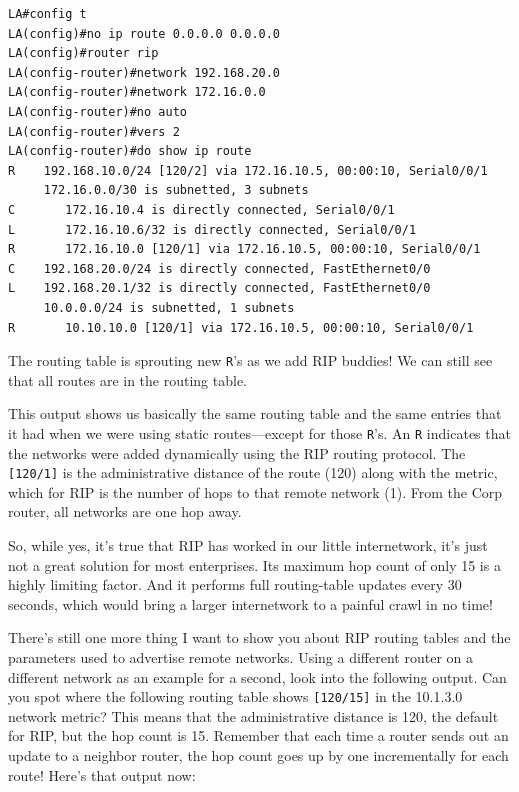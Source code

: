 \begin{verbatim}
LA#config t
LA(config)#no ip route 0.0.0.0 0.0.0.0
LA(config)#router rip
LA(config-router)#network 192.168.20.0
LA(config-router)#network 172.16.0.0
LA(config-router)#no auto
LA(config-router)#vers 2
LA(config-router)#do show ip route
R    192.168.10.0/24 [120/2] via 172.16.10.5, 00:00:10, Serial0/0/1
     172.16.0.0/30 is subnetted, 3 subnets
C       172.16.10.4 is directly connected, Serial0/0/1
L       172.16.10.6/32 is directly connected, Serial0/0/1
R       172.16.10.0 [120/1] via 172.16.10.5, 00:00:10, Serial0/0/1
C    192.168.20.0/24 is directly connected, FastEthernet0/0
L    192.168.20.1/32 is directly connected, FastEthernet0/0
     10.0.0.0/24 is subnetted, 1 subnets
R       10.10.10.0 [120/1] via 172.16.10.5, 00:00:10, Serial0/0/1
\end{verbatim}

The routing table is sprouting new \texttt{R}'s as we add RIP buddies!
We can still see that all routes are in the routing table.

This output shows us basically the same routing table and the same
entries that it had when we were using static routes---except for those
\texttt{R}'s. An \texttt{R} indicates that the networks were added
dynamically using the RIP routing protocol. The \texttt{{[}120/1{]}} is
the administrative distance of the route (120) along with the metric,
which for RIP is the number of hops to that remote network (1). From the
Corp router, all networks are one hop away.

\protect\hypertarget{c09.xhtmlux5cux23Page_396}{}{}So, while yes, it's
true that RIP has worked in our little internetwork, it's just not a
great solution for most enterprises. Its maximum hop count of only 15 is
a highly limiting factor. And it performs full routing-table updates
every 30 seconds, which would bring a larger internetwork to a painful
crawl in no time!

There's still one more thing I want to show you about RIP routing tables
and the parameters used to advertise remote networks. Using a different
router on a different network as an example for a second, look into the
following output. Can you spot where the following routing table shows
\texttt{{[}120/15{]}} in the 10.1.3.0 network metric? This means that
the administrative distance is 120, the default for RIP, but the hop
count is 15. Remember that each time a router sends out an update to a
neighbor router, the hop count goes up by one incrementally for each
route! Here's that output now:

